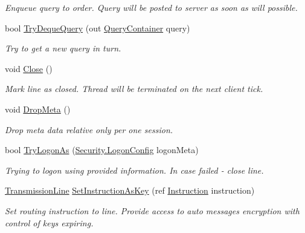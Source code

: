 \begin{DoxyCompactItemize}
\begin{DoxyCompactList}\small\item\em Enqueue query to order. Query will be posted to server as soon as will possible. \end{DoxyCompactList}\item 
bool \mbox{\hyperlink{class_pipes_provider_1_1_client_1_1_transmission_line_a48c6395608b4d32a7d852c2fd6d911e2}{Try\+Deque\+Query}} (out \mbox{\hyperlink{struct_pipes_provider_1_1_client_1_1_query_container}{Query\+Container}} query)
\begin{DoxyCompactList}\small\item\em Try to get a new query in turn. \end{DoxyCompactList}\item 
void \mbox{\hyperlink{class_pipes_provider_1_1_client_1_1_transmission_line_a5d921e9d7b0dfb366d79c6397bec9179}{Close}} ()
\begin{DoxyCompactList}\small\item\em Mark line as closed. Thread will be terminated on the next client tick. \end{DoxyCompactList}\item 
void \mbox{\hyperlink{class_pipes_provider_1_1_client_1_1_transmission_line_ae2d45dea3d22625d81634a6eea3cd356}{Drop\+Meta}} ()
\begin{DoxyCompactList}\small\item\em Drop meta data relative only per one session. \end{DoxyCompactList}\item 
bool \mbox{\hyperlink{class_pipes_provider_1_1_client_1_1_transmission_line_a75c4a1aa309fbc60cccbe258a85a91b3}{Try\+Logon\+As}} (\mbox{\hyperlink{struct_pipes_provider_1_1_security_1_1_logon_config}{Security.\+Logon\+Config}} logon\+Meta)
\begin{DoxyCompactList}\small\item\em Trying to logon using provided information. In case failed -\/ close line. \end{DoxyCompactList}\item 
\mbox{\hyperlink{class_pipes_provider_1_1_client_1_1_transmission_line}{Transmission\+Line}} \mbox{\hyperlink{class_pipes_provider_1_1_client_1_1_transmission_line_a2741ab56f9eecbe0bcbd018232321205}{Set\+Instruction\+As\+Key}} (ref \mbox{\hyperlink{class_pipes_provider_1_1_networking_1_1_routing_1_1_instruction}{Instruction}} instruction)
\begin{DoxyCompactList}\small\item\em Set routing instruction to line. Provide access to auto messages encryption with control of keys expiring. \end{DoxyCompactList}\end{DoxyCompactItemize}
